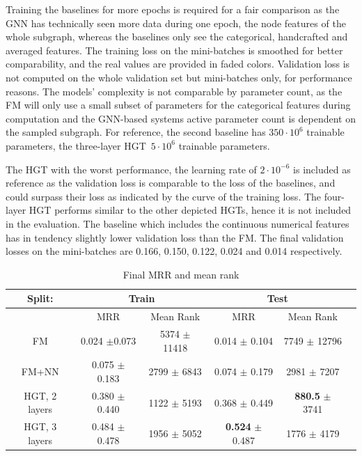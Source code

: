 Training the baselines for more epochs is required for a fair comparison as the GNN has technically seen more data during one epoch, the node features of the whole subgraph, whereas the baselines only see the categorical, handcrafted and averaged features. The training loss on the mini-batches is smoothed for better comparability, and the real values are provided in faded colors. Validation loss is not computed on the whole validation set but mini-batches only, for performance reasons. The models' complexity is not comparable by parameter count, as the FM will only use a small subset of parameters for the categorical features during computation and the GNN-based systems active parameter count is dependent on the sampled subgraph. For reference, the second baseline has $350\cdot10^6$ trainable parameters, the three-layer HGT $\,5\cdot10^6$ trainable parameters.

The HGT with the worst performance, the learning rate of $2\cdot10^{-6}$ is included as reference as the validation loss is comparable to the loss of the baselines, and could surpass their loss as indicated by the curve of the training loss. The four-layer HGT performs similar to the other depicted HGTs, hence it is not included in the evaluation. The baseline which includes the continuous numerical features has in tendency slightly lower validation loss than the FM. The final validation losses on the mini-batches are 0.166, 0.150, 0.122, 0.024 and 0.014 respectively.




\begin{table}
\centering

\begin{tabular}{|c|c|c|c|c|c|}
\hline
Split: & \multicolumn{2}{c|}{Train} & \multicolumn{2}{c|}{Test} \\
 \hline
  & MRR & Mean Rank & MRR & Mean Rank \\
\hline
FM &  0.024 $\pm$0.073 & 5374 $\pm$ 11418& 0.014 $\pm$ 0.104 & 7749 $\pm$ 12796 \\
\hline
FM+NN & 0.075  $\pm$  0.183&2799 $\pm$ 6843& 0.074 $\pm$ 0.179 & 2981 $\pm$ 7207 \\
\hline
HGT, 2 layers & 0.380 $\pm$ 0.440 &  1122 $\pm$ 5193 & 0.368 $\pm$ 0.449 & \textbf{880.5} $\pm$ 3741 \\
\hline
HGT, 3 layers &  0.484 $\pm$ 0.478 & 1956 $\pm$ 5052 & \textbf{0.524} $\pm$ 0.487  &  1776 $\pm$ 4179  \\  \hline
\end{tabular}
\caption{Final MRR and mean rank}
\label{tab:finalscores}

\end{table}


